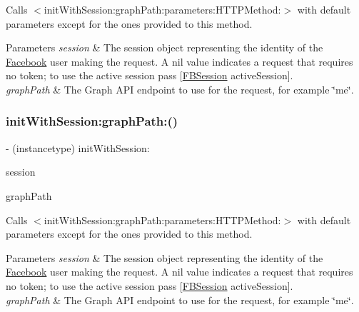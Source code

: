 Calls $<$init\+With\+Session\+:graph\+Path\+:parameters\+:\+H\+T\+T\+P\+Method\+:$>$ with default parameters except for the ones provided to this method.


\begin{DoxyParams}{Parameters}
{\em session} & The session object representing the identity of the \hyperlink{interfaceFacebook}{Facebook} user making the request. A nil value indicates a request that requires no token; to use the active session pass {\ttfamily \mbox{[}\hyperlink{interfaceFBSession}{F\+B\+Session} active\+Session\mbox{]}}.\\
\hline
{\em graph\+Path} & The Graph A\+PI endpoint to use for the request, for example \char`\"{}me\char`\"{}. \\
\hline
\end{DoxyParams}
\mbox{\label{interfaceFBRequest_abf08647708e28e2fe5422e90680bd9dc}} 
\subsubsection{\texorpdfstring{init\+With\+Session\+:graph\+Path\+:()}{initWithSession:graphPath:()}\hspace{0.1cm}{\footnotesize\ttfamily [5/5]}}
{\footnotesize\ttfamily -\/ (instancetype) init\+With\+Session\+: \begin{DoxyParamCaption}\item[{(\hyperlink{interfaceFBSession}{F\+B\+Session} $\ast$)}]{session }\item[{graphPath:(N\+S\+String $\ast$)}]{graph\+Path }\end{DoxyParamCaption}}

Calls $<$init\+With\+Session\+:graph\+Path\+:parameters\+:\+H\+T\+T\+P\+Method\+:$>$ with default parameters except for the ones provided to this method.


\begin{DoxyParams}{Parameters}
{\em session} & The session object representing the identity of the \hyperlink{interfaceFacebook}{Facebook} user making the request. A nil value indicates a request that requires no token; to use the active session pass {\ttfamily \mbox{[}\hyperlink{interfaceFBSession}{F\+B\+Session} active\+Session\mbox{]}}.\\
\hline
{\em graph\+Path} & The Graph A\+PI endpoint to use for the request, for example \char`\"{}me\char`\"{}. \\
\hline
\end{DoxyParams}
\mbox{\label{interfaceFBRequest_a4710201ef3004494a71f530a36df3e0b}} 
